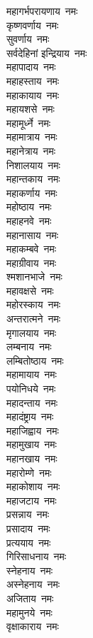 \begin{multicols}{2}
\begin{flushleft}
महागर्भपरायणाय~नमः\\
कृष्णवर्णाय~नमः\\
सुवर्णाय~नमः\\
सर्वदेहिनां इन्द्रियाय~नमः\\
महापादाय~नमः\\
महाहस्ताय~नमः\\
महाकायाय~नमः\hfill{}\\
महायशसे~नमः\\
महामूर्ध्ने~नमः\\
महामात्राय~नमः\\
महानेत्राय~नमः\\
निशालयाय~नमः\\
महान्तकाय~नमः\\
महाकर्णाय~नमः\\
महोष्ठाय~नमः\\
महाहनवे~नमः\\
महानासाय~नमः\hfill{}\\
महाकम्बवे~नमः\\
महाग्रीवाय~नमः\\
श्मशानभाजे~नमः\\
महावक्षसे~नमः\\
महोरस्काय~नमः\\
अन्तरात्मने~नमः\\
मृगालयाय~नमः\\
लम्बनाय~नमः\\
लम्बितोष्ठाय~नमः\\
महामायाय~नमः\hfill{}\\
पयोनिधये~नमः\\
महादन्ताय~नमः\\
महादंष्ट्राय~नमः\\
महाजिह्वाय~नमः\\
महामुखाय~नमः\\
महानखाय~नमः\\
महारोम्णे~नमः\\
महाकोशाय~नमः\\
महाजटाय~नमः\\
प्रसन्नाय~नमः\hfill{}\\
प्रसादाय~नमः\\
प्रत्ययाय~नमः\\
गिरिसाधनाय~नमः\\
स्नेहनाय~नमः\\
अस्नेहनाय~नमः\\
अजिताय~नमः\\
महामुनये~नमः\\
वृक्षाकाराय~नमः\\

\end{flushleft}
\end{multicols}
